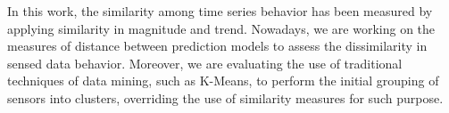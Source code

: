 \documentclass{acm_proc_article-sp}
\begin{document}
In this work, the similarity among time series behavior has been measured by
applying similarity in magnitude and trend. Nowadays, we are working on the
measures of distance between prediction models to assess the dissimilarity in
sensed data behavior. Moreover, we are evaluating the use of traditional
techniques of data mining, such as K-Means, to perform the initial grouping of
sensors into clusters, overriding the use of similarity measures for such
purpose.




  
\end{document}
